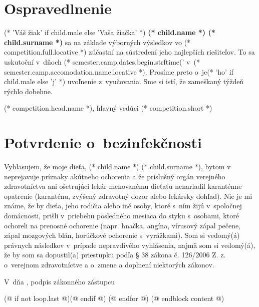        \cutHere

        \section{Ospravedlnenie}
            (* 'Váš žiak' if child.male else 'Vaša žiačka' *) \textbf{(* child.name *) (* child.surname *)}
            sa na základe výborných výsledkov vo (* competition.full.locative *)
            zúčastní na sústredení jeho najlepších riešiteľov. To sa uskutoční v~dňoch
            (* semester.camp.dates.begin.strftime('%
            v~(* semester.camp.accomodation.name.locative *). Prosíme preto o~je(* 'ho' if child.male else 'j' *) uvoľnenie z~vyučovania.
            Sme si istí, že zameškaný týždeň rýchlo dobehne.
            \vspace{5mm}

            \hfill (* competition.head.name *), hlavný vedúci (* competition.short *)

        \cutHere

        \section{Potvrdenie o~bezinfekčnosti}
            Vyhlasujem, že moje dieťa, (* child.name *) (* child.surname *), bytom v~\makebox[30mm]{\dotfill} neprejavuje príznaky akútneho ochorenia a že
            príslušný orgán verejného zdravotníctva ani ošetrujúci lekár menovanému dieťaťu nenariadil
            karanténne opatrenie (karanténu, zvýšený zdravotný dozor alebo lekársky dohľad). Nie je mi známe, že
            by dieťa, jeho rodičia alebo iné osoby, ktoré s~ním žijú v~spoločnej domácnosti, prišli v~priebehu
            posledného mesiaca do styku s~osobami, ktoré ochoreli na prenosné ochorenie (napr. hnačka, angína,
            vírusový zápal pečene, zápal mozgových blán, horúčkové ochorenie s~vyrážkami). Som si
            vedomý(á) právnych následkov v~prípade nepravdivého vyhlásenia, najmä som si vedomý(á), že by som sa
            dopustil(a) priestupku podľa § 38 zákona č. 126/2006 Z. z. o~verejnom zdravotníctve a o~zmene a
            doplnení niektorých zákonov.
            \vspace{5mm}

            V~\dotfill dňa \dotfill, \hfill podpis zákonného zástupcu \dotfill
            \vspace*{5mm}

        \cutHere
        (@ if not loop.last @)\newpage(@ endif @)
    (@ endfor @)
(@ endblock content @)
